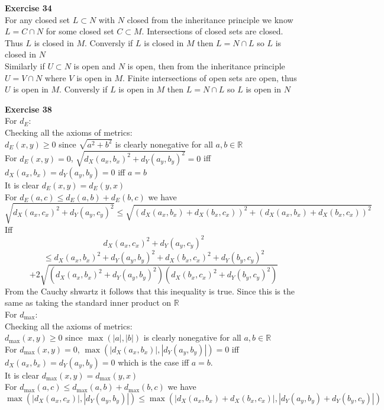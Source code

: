\documentclass[12pt]{article}
\newenvironment{ques}[1]{\textbf{Exercise #1}\vspace{1 mm}\\ }{\bigskip}
\theoremstyle{definition}
\newcommand{\R}{\mathbb R}
\begin{document}
\begin{ques}{34}
	For any closed set $L \subset N$ with $N$ closed from the inheritance
	principle we know $L = C \cap N$ for some closed set $C \subset M$.
	Intersections of closed sets are closed. Thus $L$ is closed in $M$.
	Conversly if $L$ is closed in $M$ then $L = N \cap L$ so $L$ is closed in
	$N$\\
	Similarly if $U \subset N$ is open and $N$ is open,  then from the
	inheritance principle $U = V \cap N$ where $V$ is open in $M$. Finite
	intersections of open sets are open, thus $U$ is open in $M$.
	Conversly if $L$ is open in $M$ then $L = N \cap L$ so $L$ is open in
	$N$
\end{ques}

\begin{ques}{38}
	For $d_E$:  \\
	Checking all the axioms of metrics:\\
	$d_E(x,y) \geq 0$ since $\sqrt{a^2 + b^2}$ is clearly nonegative for all
	$a,b \in \R$\\
	For $d_E(x,y) = 0$, $\sqrt{d_X(a_x,b_x)^2 + d_Y(a_y,b_y)^2} = 0$ iff $d_X(a_x,b_x) =
	d_Y(a_y,b_y) = 0$ iff $a = b$\\
	It is clear $d_E(x,y) = d_E(y,x)$\\
	For $d_E(a, c) \leq d_E(a,b) + d_E(b,c)$ we have 
	$$\sqrt{d_X(a_x,c_x)^2 + d_Y(a_y,c_y)^2} \leq \sqrt{(d_X(a_x,b_x) +
	d_X(b_x,c_x))^2 + (d_X(a_x,b_x) + d_X(b_x,c_x))^2}$$
	Iff
	$$d_X(a_x,c_x)^2 + d_Y(a_y,c_y)^2$$
	$$\leq d_X(a_x,b_x)^2 + d_Y(a_y,b_y)^2 + d_X(b_x,c_x)^2 + d_Y(b_y,c_y)^2$$
	$$+ 2\sqrt{(d_X(a_x,b_x)^2 + d_Y(a_y,b_y)^2) (d_X(b_x,c_x)^2 +
	d_Y(b_y,c_y)^2)}$$
	From the Cauchy shwartz it follows that this inequality is true. Since this
	is the same as taking the standard inner product on $\R$\\
	For $d_\text{max}$:\\
	Checking all the axioms of metrics:\\
	$d_\text{max}(x,y) \geq 0$ since $\max( |a|, |b| )$ is clearly nonegative for all
	$a,b \in \R$\\
	For $d_\text{max}(x,y) = 0$, $\max( |d_X(a_x,b_x)|, |d_Y(a_y,b_y)| )= 0$ iff
	$d_X(a_x,b_x) = d_Y(a_y,b_y) = 0$ which is the case iff $a = b$.\\
	It is clear $d_\text{max}(x,y) = d_\text{max}(y,x)$\\
	For $d_\text{max}(a, c) \leq d_\text{max}(a,b) + d_\text{max}(b,c)$ we have 
	$$\max (|d_X(a_x,c_x)| , |d_Y(a_y,b_y)|) \leq \max (|d_X(a_x,b_x) +
	d_X(b_x,c_x)| , |d_Y(a_y,b_y) + d_Y(b_y,c_y)|)$$

\end{ques}
\end{document}
